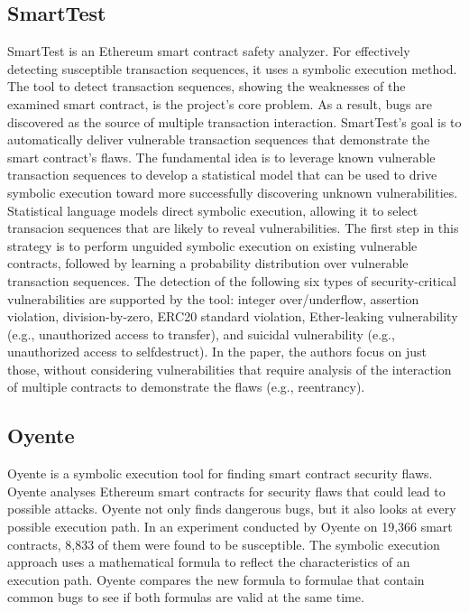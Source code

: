 \documentclass[a4paper,sigconf, language=french,
language=german, language=spanish, language=english]{acmart}
\begin{document}
\subsection{SmartTest}SmartTest is an Ethereum smart contract safety analyzer.
For effectively detecting susceptible transaction sequences, it uses a symbolic execution method.
The tool to detect transaction sequences, showing the weaknesses of the examined smart contract, is the project's core problem.
As a result, bugs are discovered as the source of multiple transaction interaction.
SmartTest's goal is to automatically deliver vulnerable transaction sequences that demonstrate the smart contract's flaws. 
The fundamental idea is to leverage known vulnerable transaction sequences to develop a statistical model that can be used to drive symbolic execution 
toward more successfully discovering unknown vulnerabilities.
Statistical language models direct symbolic execution, allowing it to select transacion sequences that are likely to reveal vulnerabilities.
The first step in this strategy is to perform unguided symbolic execution on existing vulnerable contracts, followed by learning a probability 
distribution over vulnerable transaction sequences. The detection of the following six types of security-critical vulnerabilities are supported
by the tool: integer over/underflow, assertion violation, division-by-zero, ERC20 standard
violation, Ether-leaking vulnerability (e.g., unauthorized access to transfer), and suicidal
vulnerability (e.g., unauthorized access to selfdestruct). In the paper, the authors focus on
just those, without considering vulnerabilities that require analysis of the interaction of
multiple contracts to demonstrate the flaws (e.g., reentrancy).

\subsection{Oyente}Oyente is a symbolic execution tool for finding smart contract security flaws.
Oyente analyses Ethereum smart contracts for security flaws that could lead to possible attacks.
Oyente not only finds dangerous bugs, but it also looks at every possible execution path.
In an experiment conducted by Oyente on 19,366 smart contracts, 8,833 of them were found to be susceptible.
The symbolic execution approach uses a mathematical formula to reflect the characteristics of an execution path.
Oyente compares the new formula to formulae that contain common bugs to see if both formulas are valid at the same time. 
\end{document}
